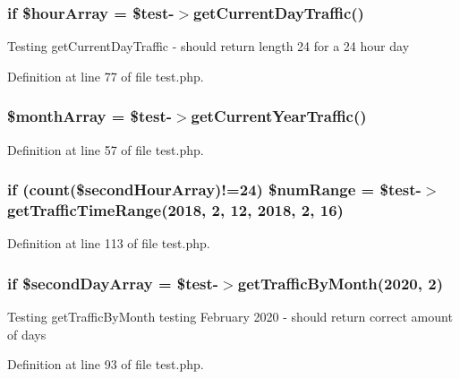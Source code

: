 \subsubsection[{\$hour\+Array}]{\setlength{\rightskip}{0pt plus 5cm}if \$hour\+Array = \$test-\/$>$get\+Current\+Day\+Traffic()}\label{test_8php_a997718df5e43b02ef37998ab52f74cb6}
Testing get\+Current\+Day\+Traffic -\/ should return length 24 for a 24 hour day 

Definition at line 77 of file test.\+php.

\subsubsection[{\$month\+Array}]{\setlength{\rightskip}{0pt plus 5cm}\$month\+Array = \$test-\/$>$get\+Current\+Year\+Traffic()}\label{test_8php_a0a9fb7e3e04662dfa0c7c2ec403e2734}


Definition at line 57 of file test.\+php.

\subsubsection[{\$num\+Range}]{\setlength{\rightskip}{0pt plus 5cm}if (count(\$second\+Hour\+Array)!=24) \$num\+Range = \$test-\/$>$get\+Traffic\+Time\+Range(2018, 2, 12, 2018, 2, 16)}\label{test_8php_a8b7af4d269daccce936da8eb0293bb6d}


Definition at line 113 of file test.\+php.

\subsubsection[{\$second\+Day\+Array}]{\setlength{\rightskip}{0pt plus 5cm}if \$second\+Day\+Array = \$test-\/$>$get\+Traffic\+By\+Month(2020, 2)}\label{test_8php_ab8151e5eb27fe41385727bc11a25f79f}
Testing get\+Traffic\+By\+Month testing February 2020 -\/ should return correct amount of days 

Definition at line 93 of file test.\+php.

